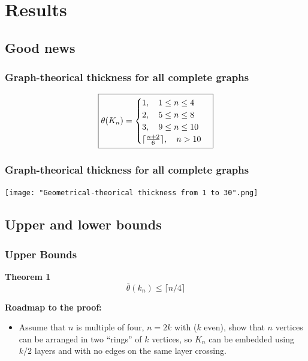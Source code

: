 \documentclass[12 pt]{beamer}
\begin{document}
\section{Results}

    \subsection{Good news}

\begin{frame}{5}
    \frametitle{Graph-theorical thickness for all complete graphs}
    
    $$
    \boxed{
    \theta (\mathnormal{K}_{n}) = 
    \begin{cases}
    1, \quad 1 \leq n \leq 4\\
    2, \quad 5 \leq n \leq 8\\
    3, \quad 9 \leq n \leq 10\\
    \lceil \frac{n + 2}{6} \rceil, \quad n > 10\\
    \end{cases}
    }
    $$

\end{frame}

\begin{frame}{5}
    \frametitle{Graph-theorical thickness for all complete graphs}
    
    \centering
    \texttt{[image: "Geometrical-theorical thickness from 1 to 30".png]}
    
\end{frame}

    \subsection{Upper and lower bounds}

\begin{frame}{}
    \frametitle{Upper Bounds}
    
    \begin{block}{\textbf{Theorem 1}}
    $$\bar{\theta} (k_{n}) \leq \lceil n/4 \rceil $$
    \end{block}
    
    \pause
    
    \textbf{Roadmap to the proof:}
    
    \begin{itemize}
        \item Assume that $n$ is multiple of four, $n = 2k$ with ($k$ even), show that $n$ vertices can be arranged in two ``rings'' of $k$ vertices, so $K_{n}$ can be embedded using $k/2$ layers and with no edges on the same layer crossing.
    \end{itemize}
\end{frame}
\end{document}
